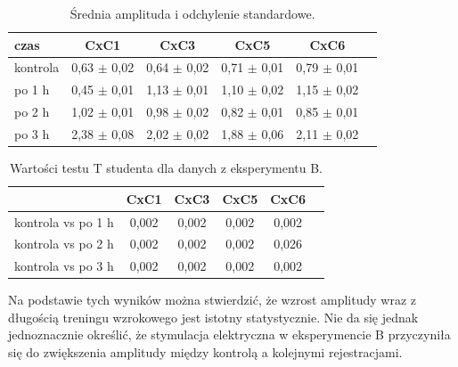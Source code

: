 \documentclass{pracamgr_2}
\begin{document}
\begin{table}[htdp]
	\caption{Średnia amplituda i odchylenie standardowe.}
	\begin{center}
		\begin{tabularx}{0.9\textwidth}{X C C C C C}
			\toprule
			\textbf{czas} & \textbf{CxC1} & \textbf{CxC3} & \textbf{CxC5} & \textbf{CxC6} \\
			\midrule
			kontrola & 0,63 $\pm$ 0,02 & 0,64 $\pm$	0,02 & 0,71 $\pm$ 0,01 & 0,79 $\pm$ 0,01\\
			po 1 h & 0,45 $\pm$	0,01 & 1,13 $\pm$ 0,01 & 1,10 $\pm$	0,02 & 1,15 $\pm$ 0,02\\
			po 2 h & 1,02 $\pm$ 0,01 & 0,98 $\pm$ 0,02  & 0,82 $\pm$ 0,01 & 0,85 $\pm$ 0,01\\
			po 3 h & 2,38 $\pm$ 0,08 & 2,02	$\pm$ 0,02 & 1,88 $\pm$ 0,06 & 2,11 $\pm$ 0,02\\
			\bottomrule
		\end{tabularx}
	\end{center}
	\label{tab:beta3_stat_CxC}
\end{table}

\begin{table}[htdp]
	\caption{Wartości testu T studenta dla danych z eksperymentu B.}
	\begin{center}
		\begin{tabularx}{0.9\textwidth}{l C C C C C}
			\toprule
			\textbf{} & \textbf{CxC1} & \textbf{CxC3} & \textbf{CxC5} & \textbf{CxC6} \\
			\midrule
			kontrola vs po 1 h & 0,002 & 0,002 & 0,002 & 0,002\\
			kontrola vs po 2 h & 0,002 & 0,002 & 0,002 & 0,026\\
			kontrola vs po 3 h & 0,002 & 0,002 & 0,002 & 0,002\\
			\bottomrule
		\end{tabularx}
	\end{center}
	\label{tab:beta_test_T}
\end{table}

\FloatBarrier

Na podstawie tych wyników można stwierdzić, że wzrost amplitudy wraz z długością treningu wzrokowego jest istotny statystycznie. Nie da się jednak jednoznacznie określić, że stymulacja elektryczna w eksperymencie B przyczyniła się do zwiększenia amplitudy między kontrolą a kolejnymi rejestracjami.
\end{document}
